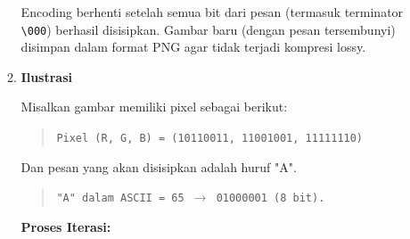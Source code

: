 \documentclass{ittelkom}
\begin{document}
\begin{enumerate}
\begin{enumerate}
                    Encoding berhenti setelah semua bit dari pesan (termasuk terminator
                    \texttt{\textbackslash 000}) berhasil disisipkan. Gambar baru (dengan pesan
                    tersembunyi) disimpan dalam format PNG agar tidak terjadi kompresi lossy.
              \item \textbf{Ilustrasi}

                    Misalkan gambar memiliki pixel sebagai berikut:

                    \begin{quote}
                        \texttt{Pixel (R, G, B) = (10110011, 11001001, 11111110)}
                    \end{quote}

                    Dan pesan yang akan disisipkan adalah huruf "A".

                    \begin{quote}
                        \texttt{"A" dalam ASCII = 65 $\rightarrow$ 01000001 (8 bit).}
                    \end{quote}

                    \textbf{Proses Iterasi:}


\end{enumerate}
\end{enumerate}
\end{document}
